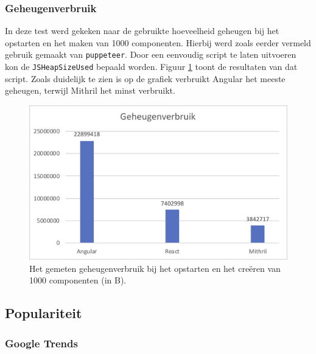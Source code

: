 \subsubsection{Geheugenverbruik}

In deze test werd gekeken naar de gebruikte hoeveelheid geheugen bij het opstarten en het maken van 1000 componenten. Hierbij werd zoals eerder vermeld gebruik gemaakt van \texttt{puppeteer}. Door een eenvoudig script te laten uitvoeren kon de \texttt{JSHeapSizeUsed} bepaald worden. Figuur \ref{fig:geheugenverbruik} toont de resultaten van dat script. Zoals duidelijk te zien is op de grafiek verbruikt Angular het meeste geheugen, terwijl Mithril het minst verbruikt.

\begin{figure}
    \includegraphics[width=\textwidth]{./img/geheugenverbruik.png}
    \caption{Het gemeten geheugenverbruik bij het opstarten en het creëren van 1000 componenten (in B).}
    \label{fig:geheugenverbruik}
\end{figure}

\subsection{Populariteit}

\subsubsection{Google Trends}

